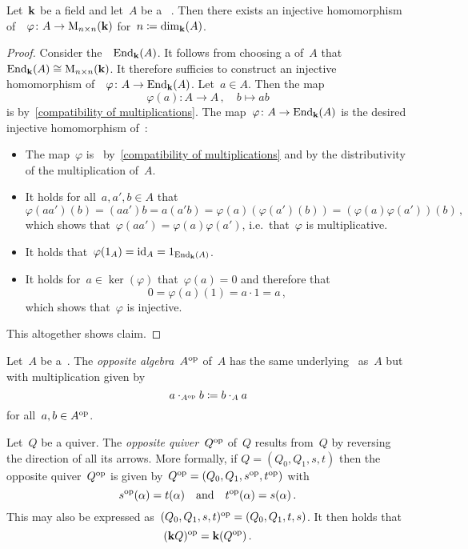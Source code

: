 \begin{lemma}
  Let~$\mathbf{k}$ be a field and let~$A$ be a {\fd}~{\kalg}.
  Then there exists an injective homomorphism of~{\kalgs}~$\varphi \colon A \to \operatorname{M}_{n \times n}(\mathbf{k})$ for~$n \coloneqq \dim_{\mathbf{k}}(A)$.
\end{lemma}


\begin{proof}
  Consider the~{\kalg}~$\operatorname{End}_{\mathbf{k}}(A)$.
  It follows from choosing a  of~$A$ that~$\operatorname{End}_{\mathbf{k}}(A) \cong \operatorname{M}_{n \times n}(\mathbf{k})$.
  It therefore sufficies to construct an injective homomorphism of~{\kalgs}~$\varphi \colon A \to \operatorname{End}_{\mathbf{k}}(A)$.
  Let~$a \in A$.
  Then the map
  \[
            \varphi(a)
    \colon  A
    \to     A \,,
    \quad   b
    \mapsto ab
  \]
  is {\klin} by~\eqref{compatibility of multiplications}.
  The map~$\varphi \colon A \to \operatorname{End}_{\mathbf{k}}(A)$ is the desired injective homomorphism of~{\kalgs}:
  \begin{itemize}
    \item
      The map~$\varphi$ is~{\klin} by~\eqref{compatibility of multiplications} and by the distributivity of the multiplication of~$A$.
    \item
      It holds for all~$a, a', b \in A$ that
      \[
          \varphi(a a')(b)
        = (a a') b
        = a (a' b)
        = \varphi(a)( \varphi(a')(b) )
        = (\varphi(a) \varphi(a'))(b) \,,
      \]
      which shows that~$\varphi(a a') = \varphi(a) \varphi(a')$, i.e.\ that~$\varphi$ is multiplicative.
    \item
      It holds that~$\varphi(1_A) = \operatorname{id}_A = 1_{\operatorname{End}_{\mathbf{k}}(A)}$.
    \item
      It holds for~$a \in \ker(\varphi)$ that~$\varphi(a) = 0$ and therefore that
      \[
          0
        = \varphi(a)(1)
        = a \cdot 1
        = a \,,
      \]
      which shows that~$\varphi$ is injective.
  \end{itemize}
  This altogether shows claim.
\end{proof}




\begin{definition}
  Let~$A$ be a~{\kalg}.
  The \emph{opposite algebra}~$A^{\mathrm{op}}$ of~$A$ has the same underlying~{\kmod} as~$A$ but with multiplication given by
  \[
              a \cdot_{A^{\mathrm{op}}} b
    \coloneqq  b \cdot_A a
  \]
  for all~$a, b \in A^{\mathrm{op}}$.
\end{definition}


\begin{example}
  Let~$Q$ be a quiver.
  The \emph{opposite quiver}~$Q^{\mathrm{op}}$ of~$Q$ results from~$Q$ by reversing the direction of all its arrows.
  More formally, if $Q = (Q_0, Q_1, s, t)$ then the opposite quiver~$Q^{\mathrm{op}}$ is given by~$Q^{\mathrm{op}} = (Q_0, Q_1, s^{\mathrm{op}}, t^{\mathrm{op}})$ with
  \[
      s^{\mathrm{op}}(\alpha)
    = t(\alpha)
    \quad\text{and}\quad
      t^{\mathrm{op}}(\alpha)
    = s(\alpha) \,.
  \]
  This may also be expressed as~$(Q_0, Q_1, s, t)^{\mathrm{op}} = (Q_0, Q_1, t, s)$.
  It then holds that
  \[
    (\mathbf{k} Q)^{\mathrm{op}} = \mathbf{k} (Q^{\mathrm{op}}) \,.
  \]
\end{example}





